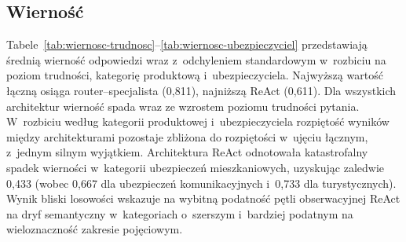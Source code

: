   \subsection{Wierność}\label{subsec:wyniki-wiernosc}

  Tabele~\ref{tab:wiernosc-trudnosc}--\ref{tab:wiernosc-ubezpieczyciel}
  przedstawiają średnią wierność odpowiedzi wraz z~odchyleniem standardowym
  w~rozbiciu na poziom trudności, kategorię produktową i~ubezpieczyciela.
  Najwyższą wartość łączną osiąga router--specjalista (0{,}811), najniższą ReAct
  (0{,}611). Dla wszystkich architektur wierność spada wraz ze wzrostem poziomu
  trudności pytania. W~rozbiciu według kategorii produktowej i~ubezpieczyciela
  rozpiętość wyników między architekturami pozostaje zbliżona do rozpiętości
  w~ujęciu łącznym, z~jednym silnym wyjątkiem. Architektura ReAct odnotowała
  katastrofalny spadek wierności w~kategorii ubezpieczeń mieszkaniowych,
  uzyskując zaledwie 0{,}433 (wobec 0{,}667 dla ubezpieczeń komunikacyjnych
  i~0{,}733 dla turystycznych). Wynik bliski losowości wskazuje na wybitną
  podatność pętli obserwacyjnej ReAct na dryf semantyczny w~kategoriach
  o~szerszym i~bardziej podatnym na wieloznaczność zakresie pojęciowym.


